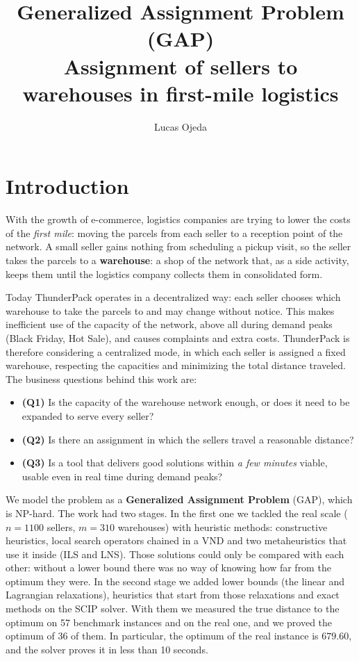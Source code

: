 \documentclass[11pt,a4paper]{article}
\title{\vspace{-1.2cm}\textbf{Generalized Assignment Problem (GAP)}\\[6pt]
       \normalsize Assignment of sellers to warehouses in first-mile logistics}
\author{Lucas Ojeda}
\date{}
\begin{document}
\maketitle
\vspace{-0.7cm}

\section{Introduction}
With the growth of e-commerce, logistics companies are trying to lower the costs of the
\emph{first mile}: moving the parcels from each seller to a reception point of the network. A
small seller gains nothing from scheduling a pickup visit, so the seller takes the parcels to a
\textbf{warehouse}: a shop of the network that, as a side activity, keeps them until the logistics
company collects them in consolidated form.

Today ThunderPack operates in a decentralized way: each seller chooses which warehouse to take the
parcels to and may change without notice. This makes inefficient use of the capacity of the
network, above all during demand peaks (Black Friday, Hot Sale), and causes complaints and extra
costs. ThunderPack is therefore considering a centralized mode, in which each seller is assigned a
fixed warehouse, respecting the capacities and minimizing the total distance traveled. The
business questions behind this work are:

\begin{itemize}
  \item \textbf{(Q1)} Is the capacity of the warehouse network enough, or does it need to be
        expanded to serve every seller?
  \item \textbf{(Q2)} Is there an assignment in which the sellers travel a reasonable distance?
  \item \textbf{(Q3)} Is a tool that delivers good solutions within \emph{a few minutes} viable,
        usable even in real time during demand peaks?
\end{itemize}

We model the problem as a \textbf{Generalized Assignment Problem} (GAP), which is NP-hard. The
work had two stages. In the first one we tackled the real scale ($n=1100$ sellers, $m=310$
warehouses) with heuristic methods: constructive heuristics, local search operators chained in a
VND and two metaheuristics that use it inside (ILS and LNS). Those solutions could only be compared
with each other: without a lower bound there was no way of knowing how far from the optimum they
were. In the second stage we added lower bounds (the linear and Lagrangian relaxations),
heuristics that start from those relaxations and exact methods on the SCIP solver. With them we
measured the true distance to the optimum on 57 benchmark instances and on the real one, and we
proved the optimum of 36 of them. In particular, the optimum of the real instance is $679.60$, and
the solver proves it in less than 10 seconds.
\end{document}
